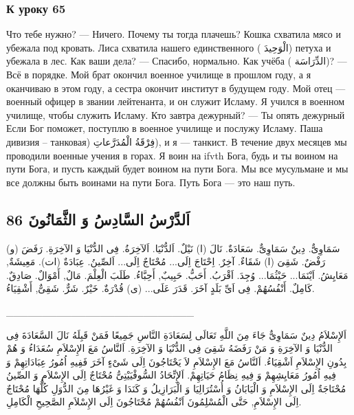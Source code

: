 \documentclass[a5paper]{article}
\begin{document}
\subsubsection{К уроку 65}
Что тебе нужно? — Ничего. Почему ты тогда плачешь? Кошка схватила мясо и убежала под кровать. Лиса схватила нашего единственного ( الْوَحِيدَ) петуха и убежала в лес. Как ваши дела? — Спасибо, нормально. Как учёба ( الدِّرَاسَة)? — Всё в порядке. Мой брат окончил военное училище в прошлом году, а я оканчиваю в этом году, а сестра окончит институт в будущем году. Мой отец — военный офицер в звании лейтенанта, и он служит Исламу. Я учился в военном училище, чтобы служить Исламу. Кто завтра дежурный? — Ты опять дежурный Если Бог поможет, поступлю в военное училище и послужу Исламу. Паша дивизия – танковая) فِرْقَةُ الْمُدَرَّعاتِ), и я — танкист. В течение двух месяцев мы проводили военные учения в горах. Я воин на ifvth Бога, будь и ты воином на пути Бога, и пусть каждый будет воином на пути Бога. Мы все мусульмане и мы все должны быть воинами на пути Бога. Путь Бога — это наш путь.

\subsection[اَلدَّرْسُ السَّادِسُ وَ الثَّمَانُونَ 86]{اَلدَّرْسُ السَّادِسُ وَ الثَّمَانُونَ 86}
سَمَاوِىٌّ. دِينٌ سَمَاوِىٌّ. سَعَادَةٌ. نَالَ (ا) نَيْلٌ. اَلدُّنْيَا. اَلآخِرَةُ. فِى الدُّنْيَا وَ الآخِرَةِ. رَفَضَ (و) رَفْضٌ. شَقِىَ (ا) شَقَاءٌ. آخِرٌ. اِحْتَاجَ اِلَى... مُحْتَاجٌ اِلَى... اَلصِّينُ. عِبَادَةٌ (ات). مَعِيشَةٌ, مَعَايِشُ. اَيْنَمَا... حَيْثُمَا... وُجِدَ. اَقْرَبُ. أَحَبُّ. حَبِيبٌ, أَحِبَّاءُ. طَلَبَ الْعِلْمَ. مَالٌ, أَمْوَالٌ. صَادِقٌ. كَامِلٌ. أَنْفُسُهُمْ. فِى اَىِّ بَلَدٍ آخَرَ. قَدَرَ عَلَى... (ى) قُدْرَةٌ. خَيْرٌ. شَرٌّ. شَقِىٌّ, أَشْقِيَاءُ.

\_\_\_\_\_\_\_\_\_\_\_\_\_\_\_\_\_\_\_\_\_\_\_\_\_\_

اَلإِسْلاَمُ دِينٌ سَمَاوِىٌّ جَاءَ مِنَ اللَّهِ تَعَالَى لِسَعَادَةِ النَّاسِ جَمِيعًا فَمَنْ قَبِلَهُ نَالَ السَّعَادَةَ فِى الدُّنْيَا وَ الآخِرَةِ وَ مَنْ رَفَضَهُ شَقِىَ فِى الدُّنْيَا وَ الآخِرَةِ. اَلنَّاسُ مَعَ الإِسْلاَمِ سُعَدَاءُ وَ هُمْ بِدُونِ الإِسْلاَمِ اَشْقِيَاءُ. اَلنَّاسُ مَعَ الإِسْلاَمِ لاَ يَحْتَاجُونَ اِلَى شَىْءٍ آخَرَ فَفِيهِ اُمُورُ عِبَادَاتِهِمْ وَ فِيهِ اُمُورُ مَعَايِشِهِمْ وَ فِيهِ نِظَامُ حَيَاتِهِمْ. اَلإِتِّحَادُ السُّوفْيَيْتِىُّ مُحْتَاجٌ اِلَى الإِسْلاَمِ وَ الصِّينُ مُحْتَاجَةٌ اِلَى الإِسْلاَمِ وَ الْيَابَانُ وَ أُسْتُرَالِيَا وَ الْبَرَازِيلُ وَ كَنَدَا وَ غَيْرُهَا مِنَ الدُّوَلِ كُلُّهَا مُحْتَاجٌ اِلَى الإِسْلاَمِ, حَتَّى الْمُسْلِمُونَ اَنْفُسُهُمْ مُحْتَاجُونَ اِلَى الإِسْلاَمِ الصَّحِيحِ الْكَامِلِ.
\end{document}
